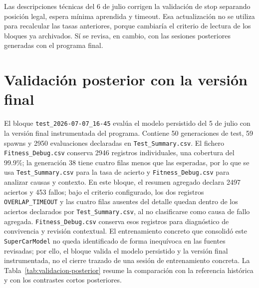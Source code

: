 Las descripciones técnicas del 6 de julio corrigen la validación de stop separando posición legal, espera mínima aprendida y timeout. Esa actualización no se utiliza para recalcular las tasas anteriores, porque cambiaría el criterio de lectura de los bloques ya archivados. Sí se revisa, en cambio, con las sesiones posteriores generadas con el programa final.

\section{Validación posterior con la versión final}
\label{sec:validacion-posterior}

El bloque \texttt{test\_2026-07-07\_16-45} evalúa el modelo persistido del 5 de julio con la versión final instrumentada del programa. Contiene 50 generaciones de test, 59 spawns y 2950 evaluaciones declaradas en \texttt{Test\_Summary.csv}. El fichero \texttt{Fitness\_Debug.csv} conserva 2946 registros individuales, una cobertura del 99.9\%; la generación 38 tiene cuatro filas menos que las esperadas, por lo que se usa \texttt{Test\_Summary.csv} para la tasa de acierto y \texttt{Fitness\_Debug.csv} para analizar causas y contexto. En este bloque, el resumen agregado declara 2497 aciertos y 453 fallos; bajo el criterio configurado, los dos registros \texttt{OVERLAP\_TIMEOUT} y las cuatro filas ausentes del detalle quedan dentro de los aciertos declarados por \texttt{Test\_Summary.csv}, al no clasificarse como causa de fallo agregada. \texttt{Fitness\_Debug.csv} conserva esos registros para diagnóstico de convivencia y revisión contextual. El entrenamiento concreto que consolidó este \texttt{SuperCarModel} no queda identificado de forma inequívoca en las fuentes revisadas; por ello, el bloque valida el modelo persistido y la versión final instrumentada, no el cierre trazado de una sesión de entrenamiento concreta. La Tabla~\ref{tab:validacion-posterior} resume la comparación con la referencia histórica y con los contrastes cortos posteriores.

